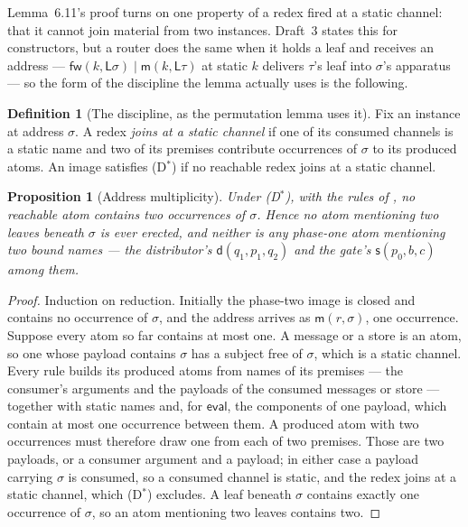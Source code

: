 \documentclass[11pt,a4paper]{article}
\theoremstyle{plain}
\newtheorem{proposition}[theorem]{Proposition}
\theoremstyle{definition}
\newtheorem{definition}[theorem]{Definition}
\theoremstyle{remark}
\newcommand{\mm}{\mathsf{m}}
\newcommand{\dd}{\mathsf{d}}
\newcommand{\fw}{\mathsf{fw}}
\newcommand{\sy}{\mathsf{s}}
\newcommand{\Lft}{\mathsf{L}}
\begin{document}
Lemma~6.11's proof turns on one property of a redex fired at a static
channel: that it cannot join material from two instances. Draft~3 states this
for constructors, but a router does the same when it holds a leaf and receives
an address --- $\fw(k,\Lft\sigma) \mid \mm(k,\Lft\tau)$ at static $k$ delivers
$\tau$'s leaf into $\sigma$'s apparatus --- so the form of the discipline the
lemma actually uses is the following.

\begin{definition}[The discipline, as the permutation lemma uses it]
\label{def:dstar}
Fix an instance at address $\sigma$. A redex \emph{joins at a static channel}
if one of its consumed channels is a static name and two of its premises
contribute occurrences of $\sigma$ to its produced atoms. An image satisfies
(D$^{\ast}$) if no reachable redex joins at a static channel.
\end{definition}

\begin{proposition}[Address multiplicity]
\label{prop:multiplicity}
Under (D$^{\ast}$), with the rules of \cite[Def.~3.3, Def.~3.8]{rhocomb3}, no
reachable atom contains two occurrences of $\sigma$. Hence no atom mentioning
two leaves beneath $\sigma$ is ever erected, and neither is any phase-one atom
mentioning two bound names --- the distributor's $\dd(q_{1},p_{1},q_{2})$ and
the gate's $\sy(p_{0},b,c)$ among them.
\end{proposition}

\begin{proof}
Induction on reduction. Initially the phase-two image is closed and contains
no occurrence of $\sigma$, and the address arrives as $\mm(r,\sigma)$, one
occurrence. Suppose every atom so far contains at most one. A message or a
store is an atom, so one whose payload contains $\sigma$ has a subject free of
$\sigma$, which is a static channel. Every rule builds its produced atoms from
names of its premises --- the consumer's arguments and the payloads of the
consumed messages or store --- together with static names and, for
$\mathsf{eval}$, the
components of one payload, which contain at most one occurrence between them.
A produced atom with two occurrences must therefore draw one from each of two
premises. Those are two payloads, or a consumer argument and a payload; in
either case a payload carrying $\sigma$ is consumed, so a consumed channel is
static, and the redex joins at a static channel, which (D$^{\ast}$) excludes.
A leaf beneath $\sigma$ contains exactly one occurrence of $\sigma$, so an
atom mentioning two leaves contains two.
\end{proof}
\end{document}
